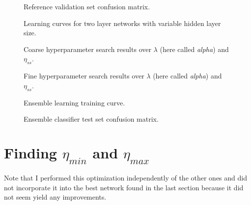\documentclass{article}
\begin{document}
\begin{figure}
  \centering
    
  \caption{Reference validation set confusion matrix.}
  \label{fig:baseline}
\end{figure}

\begin{figure}
  \centering
    
  \caption{Learning curves for two layer networks with variable hidden layer size.}
  \label{fig:more_hidden_nodes}
\end{figure}

\begin{figure}
  \centering
    
  \caption{Coarse hyperparameter search results over $\lambda$ (here called
           \textit{alpha}) and $\eta_{ss}$.}
  \label{fig:exhaustive_coarse}
\end{figure}

\begin{figure}
  \centering
    
  \caption{Fine hyperparameter search results over $\lambda$ (here called
           \textit{alpha}) and $\eta_{ss}$.}
  \label{fig:exhaustive_fine}
\end{figure}

\begin{figure}
  \centering
    
  \caption{Ensemble learning training curve.}
  \label{fig:ensemble_curves}
\end{figure}

\begin{figure}
  \centering
    
  \caption{Ensemble classifier test set confusion matrix.}
  \label{fig:final_performance}
\end{figure}

\pagebreak

\section{Finding $\eta_{min}$ and $\eta_{max}$}

Note that I performed this optimization independently of the other
ones and did not incorporate it into the best network found in the last section
because it did not seem yield any improvements.
\end{document}
